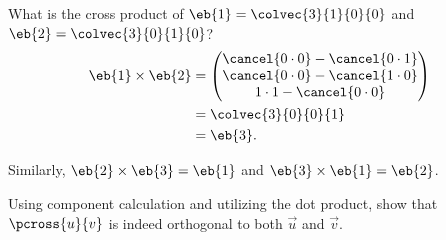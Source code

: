 \begin{example}
  What is the cross product of $\eb{1}=\colvec{3}{1}{0}{0}$ and $\eb{2}=\colvec{3}{0}{1}{0}$?
  \begin{align*}
  \eb{1}\times\eb{2} &= \begin{pmatrix}\cancel{0\cdot0}-\cancel{0\cdot1}\\\cancel{0\cdot0}-\cancel{1\cdot0}\\1\cdot1-\cancel{0\cdot0}\end{pmatrix}\\
  &= \colvec{3}{0}{0}{1}\\
  &= \eb{3}.
  \end{align*}

  Similarly, $\eb{2}\times\eb{3}=\eb{1}$ and $\eb{3}\times\eb{1}=\eb{2}$.
\end{example}

\begin{challange}
  Using component calculation and utilizing the dot product, show that $\pcross{u}{v}$ is indeed orthogonal to both $\vec{u}$ and $\vec{v}$.
\end{challange}
